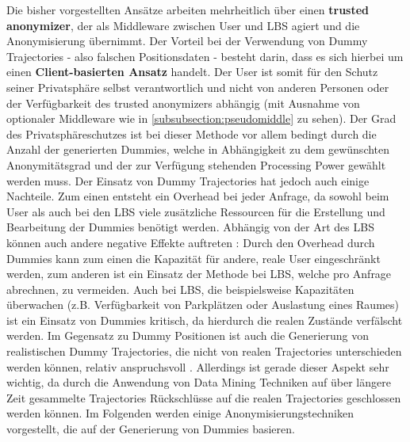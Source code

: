 Die bisher vorgestellten Ansätze arbeiten mehrheitlich über einen \textbf{trusted anonymizer}, der als Middleware zwischen User und LBS agiert und die Anonymisierung übernimmt. Der Vorteil bei der Verwendung von Dummy Trajectories - also falschen Positionsdaten - besteht darin, dass es sich hierbei um einen \textbf{Client-basierten Ansatz} handelt. Der User ist somit für den Schutz seiner Privatsphäre selbst verantwortlich und nicht von anderen Personen oder der Verfügbarkeit des trusted anonymizers abhängig (mit Ausnahme von optionaler Middleware wie in \ref{subsubsection:pseudomiddle} zu sehen). 
Der Grad des Privatsphäreschutzes ist bei dieser Methode vor allem bedingt durch die Anzahl der generierten Dummies, welche in Abhängigkeit zu dem gewünschten Anonymitätsgrad und der zur Verfügung stehenden Processing Power gewählt werden muss.
Der Einsatz von Dummy Trajectories hat jedoch auch einige Nachteile. Zum einen entsteht ein Overhead bei jeder Anfrage, da sowohl beim User als auch bei den LBS viele zusätzliche Ressourcen für die Erstellung und Bearbeitung der Dummies benötigt werden. Abhängig von der Art des LBS können auch andere negative Effekte auftreten \cite{Beresford2005}: Durch den Overhead durch Dummies kann zum einen die Kapazität für andere, reale User eingeschränkt werden, zum anderen ist ein Einsatz der Methode bei LBS, welche pro Anfrage abrechnen, zu vermeiden. Auch bei LBS, die beispielsweise Kapazitäten überwachen (z.B. Verfügbarkeit von Parkplätzen oder Auslastung eines Raumes) ist ein Einsatz von Dummies kritisch, da hierdurch die realen Zustände verfälscht werden.
Im Gegensatz zu Dummy Positionen ist auch die Generierung von realistischen Dummy Trajectories, die nicht von realen Trajectories unterschieden werden können, relativ anspruchsvoll \cite{Beresford2003}. Allerdings ist gerade dieser Aspekt sehr wichtig, da durch die Anwendung von Data Mining Techniken auf über längere Zeit gesammelte Trajectories Rückschlüsse auf die realen Trajectories geschlossen werden können. Im Folgenden werden einige Anonymisierungstechniken vorgestellt, die auf der Generierung von Dummies basieren.



